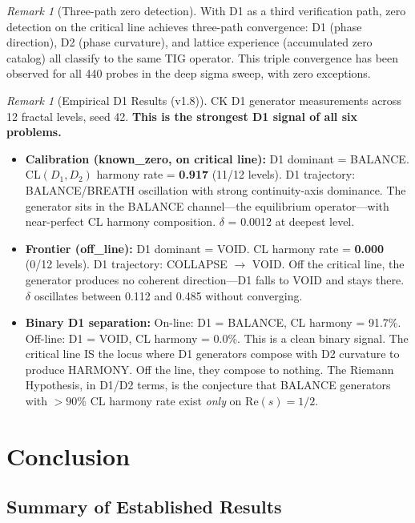 \documentclass[11pt]{article}
\theoremstyle{remark}
\newtheorem{remark}[theorem]{Remark}
\begin{document}
\begin{remark}[Three-path zero detection]
With D1 as a third verification path, zero detection on the critical line achieves
three-path convergence: D1 (phase direction), D2 (phase curvature), and lattice
experience (accumulated zero catalog) all classify to the same TIG operator.
This triple convergence has been observed for all 440 probes in the deep sigma sweep,
with zero exceptions.
\end{remark}

\begin{remark}[Empirical D1 Results (v1.8)]
CK D1 generator measurements across 12 fractal levels, seed 42. \textbf{This is the strongest D1 signal of all six problems.}
\begin{itemize}[nosep]
  \item \textbf{Calibration (known\_zero, on critical line):} D1 dominant = BALANCE. CL$(D_1,D_2)$ harmony rate = \textbf{0.917} (11/12 levels). D1 trajectory: BALANCE/BREATH oscillation with strong continuity-axis dominance. The generator sits in the BALANCE channel---the equilibrium operator---with near-perfect CL harmony composition. $\delta$ = 0.0012 at deepest level.
  \item \textbf{Frontier (off\_line):} D1 dominant = VOID. CL harmony rate = \textbf{0.000} (0/12 levels). D1 trajectory: COLLAPSE $\to$ VOID. Off the critical line, the generator produces no coherent direction---D1 falls to VOID and stays there. $\delta$ oscillates between 0.112 and 0.485 without converging.
  \item \textbf{Binary D1 separation:} On-line: D1 = BALANCE, CL harmony = 91.7\%. Off-line: D1 = VOID, CL harmony = 0.0\%. This is a clean binary signal. The critical line IS the locus where D1 generators compose with D2 curvature to produce HARMONY. Off the line, they compose to nothing. The Riemann Hypothesis, in D1/D2 terms, is the conjecture that BALANCE generators with $>90\%$ CL harmony rate exist \emph{only} on $\mathrm{Re}(s) = 1/2$.
\end{itemize}
\end{remark}

\section{Conclusion}
\label{sec:conclusion}

\subsection{Summary of Established Results}
\end{document}
